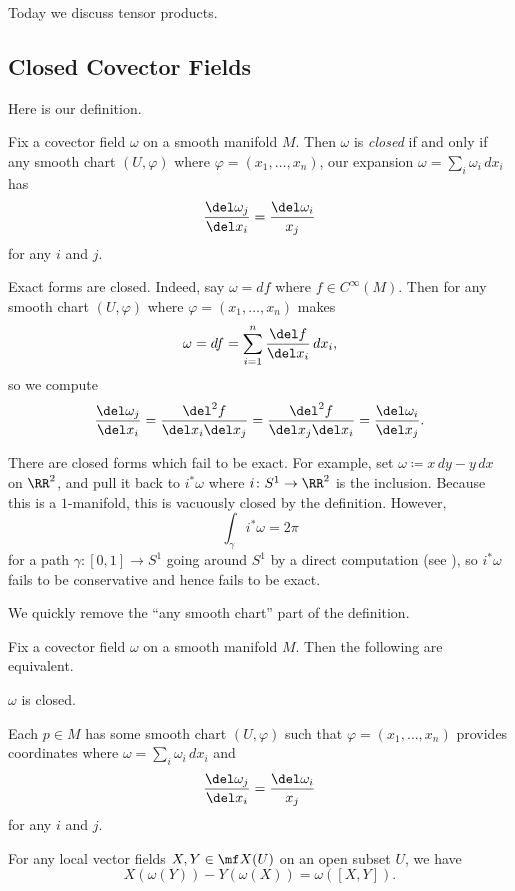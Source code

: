 \documentclass[../notes.tex]{subfiles}
\begin{document}
Today we discuss tensor products.

\subsection{Closed Covector Fields}
Here is our definition.
\begin{definition}[closed]
	Fix a covector field $\omega$ on a smooth manifold $M$. Then $\omega$ is \textit{closed} if and only if any smooth chart $(U,\varphi)$ where $\varphi=(x_1,\ldots,x_n)$, our expansion $\omega=\sum_i\omega_i\,dx_i$ has
	\[\frac{\del\omega_j}{\del x_i}=\frac{\del\omega_i}{x_j}\]
	for any $i$ and $j$.
\end{definition}
\begin{example}
	Exact forms are closed. Indeed, say $\omega=df$ where $f\in C^\infty(M)$. Then for any smooth chart $(U,\varphi)$ where $\varphi=(x_1,\ldots,x_n)$ makes
	\[\omega=df=\sum_{i=1}^n\frac{\del f}{\del x_i}\,dx_i,\]
	so we compute
	\[\frac{\del\omega_j}{\del x_i}=\frac{\del^2f}{\del x_i\del x_j}=\frac{\del^2f}{\del x_j\del x_i}=\frac{\del\omega_i}{\del x_j}.\]
\end{example}
\begin{remark}
	There are closed forms which fail to be exact. For example, set $\omega\coloneqq x\,dy-y\,dx$ on $\RR^2$, and pull it back to $i^*\omega$ where $i\colon S^1\to\RR^2$ is the inclusion. Because this is a $1$-manifold, this is vacuously closed by the definition. However, 
	\[\int_{\gamma}i^*\omega=2\pi\]
	for a path $\gamma\colon[0,1]\to S^1$ going around $S^1$ by a direct computation (see ), so $i^*\omega$ fails to be conservative and hence fails to be exact.
\end{remark}
We quickly remove the ``any smooth chart'' part of the definition.
\begin{lemma}
	Fix a covector field $\omega$ on a smooth manifold $M$. Then the following are equivalent.
	\begin{listroman}
		\item $\omega$ is closed.
		\item Each $p\in M$ has some smooth chart $(U,\varphi)$ such that $\varphi=(x_1,\ldots,x_n)$ provides coordinates where $\omega=\sum_i\omega_i\,dx_i$ and
		\[\frac{\del\omega_j}{\del x_i}=\frac{\del\omega_i}{x_j}\]
		for any $i$ and $j$.
		\item For any local vector fields $X,Y\in\mf X(U)$ on an open subset $U$, we have
		\[X(\omega(Y))-Y(\omega(X))=\omega([X,Y]).\]
	\end{listroman}
\end{lemma}
\end{document}

